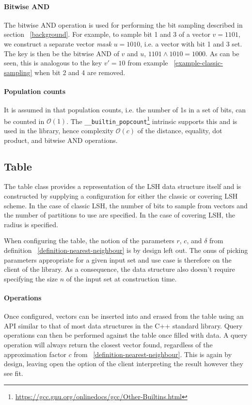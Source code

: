 \paragraph{Bitwise AND} The bitwise AND operation is used for performing the bit sampling described in section ~\ref{background}. For example, to sample bit 1 and 3 of a vector $v = 1101$, we construct a separate vector \textit{mask} $u = 1010$, i.e. a vector with bit 1 and 3 set. The key is then be the bitwise AND of $v$ and $u$, $1101 \wedge 1010 = 1000$. As can be seen, this is analogous to the key $v' = 10$ from example ~\ref{example-classic-sampling} when bit 2 and 4 are removed.

\paragraph{Population counts} It is assumed in \cite{DBLP:journals/corr/Pagh15} that population counts, i.e. the number of 1s in a set of bits, can be counted in $\mathcal{O}(1)$. The \texttt{\_\_builtin\_popcount}\footnote{\url{https://gcc.gnu.org/onlinedocs/gcc/Other-Builtins.html}} intrinsic supports this and is used in the library, hence complexity $\mathcal{O}(c)$ of the distance, equality, dot product, and bitwise AND operations.

\subsection{Table}

The table class provides a representation of the LSH data structure itself and is constructed by supplying a configuration for either the classic or covering LSH scheme. In the case of classic LSH, the number of bits to sample from vectors and the number of partitions to use are specified. In the case of covering LSH, the radius is specified.

When configuring the table, the notion of the parameters $r$, $c$, and $\delta$ from definition ~\ref{definition-nearest-neighbour} is by design left out. The onus of picking parameters appropriate for a given input set and use case is therefore on the client of the library. As a consequence, the data structure also doesn't require specifying the size $n$ of the input set at construction time.

\paragraph{Operations} Once configured, vectors can be inserted into and erased from the table using an API similar to that of most data structures in the C++ standard library. Query operations can then be performed against the table once filled with data. A query operation will always return the closest vector found, regardless of the approximation factor $c$ from ~\ref{definition-nearest-neighbour}. This is again by design, leaving open the option of the client interpreting the result however they see fit.

